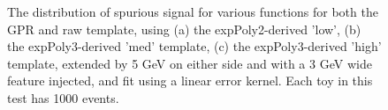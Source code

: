 \begin{figure} 
\begin{center}

\caption{The distribution of spurious signal for various functions for both the GPR and raw template, using (a) the expPoly2-derived 'low', (b) the expPoly3-derived 'med' template, (c) the expPoly3-derived 'high' template, extended by 5 GeV on either side and with a 3 GeV wide feature injected, and fit using a linear error kernel. Each toy in this test has 1000 events.}
\label{fig:linearkernel_lowpt_1000_Sig_1s}
\end{center}
\end{figure}


